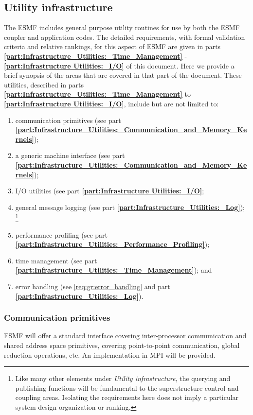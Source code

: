 \subsection{Utility infrastructure}
The ESMF includes general purpose utility routines for use by both 
the ESMF coupler and application codes.
The detailed requirements, with formal validation criteria
and relative rankings, for this aspect of ESMF are given
in parts {\bf \ref{part:Infrastructure_Utilities:_Time_Management}} -
 {\bf \ref{part:Infrastructure Utilities:_I/O}} of this document.
Here we provide a brief synopsis of the areas that are covered
in that part of the document.
These utilities, described in parts {\bf \ref{part:Infrastructure_Utilities:_Time_Management}} to 
{\bf \ref{part:Infrastructure Utilities:_I/O}},
include but are not limited to:
\begin{enumerate}
\item communication primitives (see part {\bf \ref{part:Infrastructure_Utilities:_Communication_and_Memory_Kernels}});
\item a generic machine interface (see part {\bf \ref{part:Infrastructure_Utilities:_Communication_and_Memory_Kernels}});
\item I/O utilities (see part {\bf \ref{part:Infrastructure Utilities:_I/O}};
\item general message logging (see part {\bf \ref{part:Infrastructure_Utilities:_Log}});
\footnote{Like many other elements under
{\it Utility infrastructure}, the querying and publishing functions will be 
fundamental to the superstructure control and coupling areas. Isolating the
requirements here does not imply a particular system design organization
or ranking.
}
\item performance profiling (see part {\bf \ref{part:Infrastructure_Utilities:_Performance_Profiling}});
\item time management (see part {\bf \ref{part:Infrastructure_Utilities:_Time_Management}}); and
\item error handling (see \ref{req:gr:error_handling} and part {\bf \ref{part:Infrastructure_Utilities:_Log}}).
\end{enumerate}

\subsubsection{Communication primitives}

ESMF will offer a standard interface covering inter-processor
communication and shared address space primitives, covering
point-to-point communication, global reduction operations, etc. An
implementation in MPI will be provided.


